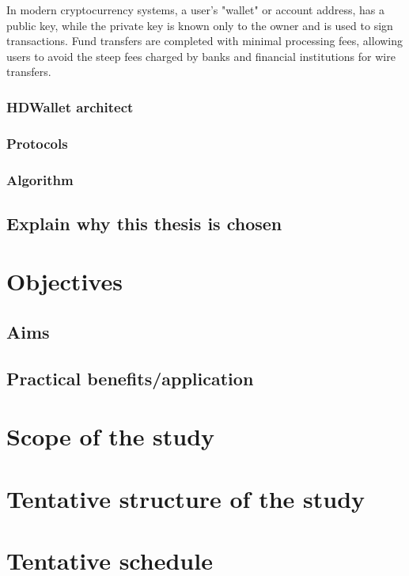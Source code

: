 In modern cryptocurrency systems, a user's "wallet" or account address, has a public key, while the private key is known only to the owner and is used to sign transactions. Fund transfers are completed with minimal processing fees, allowing users to avoid the steep fees charged by banks and financial institutions for wire transfers.

\subsubsection{HDWallet architect}

\subsubsection{Protocols}

\subsubsection{Algorithm}

\subsection{Explain why this thesis is chosen}

\section{Objectives}

\subsection{Aims}

\subsection{Practical benefits/application}

\section{Scope of the study}

\section{Tentative structure of the study}

\section{Tentative schedule}